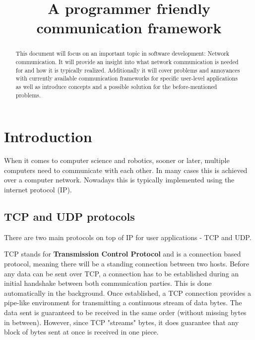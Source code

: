 \documentclass[conference]{IEEEtran}
\begin{document}
\title{A programmer friendly communication framework}

\author{
    \and
}

\maketitle

\begin{abstract}
    This document will focus on an important topic in software development: Network communication. It will provide an insight into what network communication is needed for and how it is typically realized. Additionally it will cover problems and annoyances with currently available communication frameworks for specific user-level applications as well as introduce concepts and a possible solution for the before-mentioned problems.
\end{abstract}

\section{Introduction}

When it comes to computer science and robotics, sooner or later, multiple computers need to communicate with each other. In many cases this is achieved over a computer network. Nowadays this is typically implemented using the internet protocol (IP).


\subsection{TCP and UDP protocols}

There are two main protocols on top of IP for user applications - TCP and UDP. 

TCP stands for \textbf{Transmission Control Protocol} and is a connection based protocol, meaning there will be a standing connection between two hosts. Before any data can be sent over TCP, a connection has to be established during an initial handshake between both communication parties. This is done automatically in the background. Once established, a TCP connection provides a pipe-like environment for transmitting a continuous stream of data bytes. The data sent is guaranteed to be received in the same order (without missing bytes in between). However, since TCP "streams" bytes, it does guarantee that any block of bytes sent at once is received in one piece.
\end{document}
